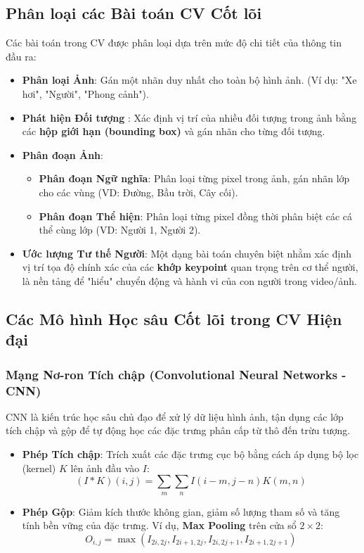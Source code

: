 \subsection{Phân loại các Bài toán CV Cốt lõi}
Các bài toán trong CV được phân loại dựa trên mức độ chi tiết của thông tin đầu ra:

\begin{itemize}
    \item \textbf{Phân loại Ảnh}: Gán một nhãn duy nhất cho toàn bộ hình ảnh. (Ví dụ: "Xe hơi", "Người", "Phong cảnh").
    \item \textbf{Phát hiện Đối tượng }: Xác định vị trí của nhiều đối tượng trong ảnh bằng các \textbf{hộp giới hạn (bounding box)} và gán nhãn cho từng đối tượng.
    \item \textbf{Phân đoạn Ảnh}:
    \begin{itemize}
        \item \textbf{Phân đoạn Ngữ nghĩa}: Phân loại từng pixel trong ảnh, gán nhãn lớp cho các vùng (VD: Đường, Bầu trời, Cây cối).
        \item \textbf{Phân đoạn Thể hiện}: Phân loại từng pixel đồng thời phân biệt các cá thể cùng lớp (VD: Người 1, Người 2).
    \end{itemize}
    \item \textbf{Ước lượng Tư thế Người}: Một dạng bài toán chuyên biệt nhằm xác định vị trí tọa độ chính xác của các \textbf{khớp keypoint} quan trọng trên cơ thể người, là nền tảng để "hiểu" chuyển động và hành vi của con người trong video/ảnh.
\end{itemize}

\subsection{Các Mô hình Học sâu Cốt lõi trong CV Hiện đại}
\subsubsection{Mạng Nơ-ron Tích chập (Convolutional Neural Networks - CNN)}
CNN là kiến trúc học sâu chủ đạo để xử lý dữ liệu hình ảnh, tận dụng các lớp tích chập và gộp để tự động học các đặc trưng phân cấp từ thô đến trừu tượng.

\begin{itemize}
    \item \textbf{Phép Tích chập}: Trích xuất các đặc trưng cục bộ bằng cách áp dụng bộ lọc (kernel) $K$ lên ảnh đầu vào $I$:
    \begin{equation}
    (I * K)(i, j) = \sum_{m} \sum_{n} I(i-m, j-n) K(m, n)
    \end{equation}
    \item \textbf{Phép Gộp}: Giảm kích thước không gian, giảm số lượng tham số và tăng tính bền vững của đặc trưng. Ví dụ, \textbf{Max Pooling} trên cửa sổ $2 \times 2$:
    \begin{equation}
    O_{i,j} = \max \left( I_{2i, 2j}, I_{2i+1, 2j}, I_{2i, 2j+1}, I_{2i+1, 2j+1} \right)
    \end{equation}
\end{itemize}

